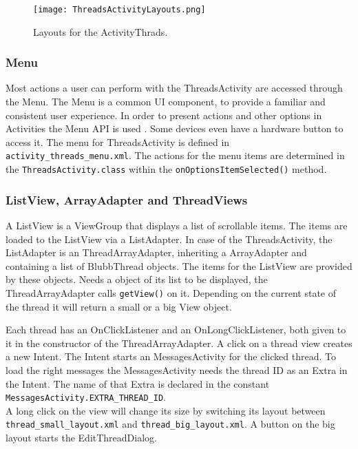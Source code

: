 \documentclass[12pt,a4paper,oneside]{report}
\newcommand{\code}[1]{\lstinline{#1}}
\begin{document}
\begin{figure}[!ht]
	\centering
    \texttt{[image: ThreadsActivityLayouts.png]}
	\caption{Layouts for the ActivityThrads.}
	\label{fig:ThreadsActivityLayouts}
\end{figure}


\subsubsection{Menu}
Most actions a user can perform with the ThreadsActivity are accessed through the Menu. The Menu is a common UI component, to provide a familiar and consistent user experience. In order to present actions and other options in Activities the Menu API is used \citep{aDefMenu}. Some devices even have a hardware button to access it. The menu for ThreadsActivity is defined in \code{activity_threads_menu.xml}.
 The actions for the menu items are determined in the \code{ThreadsActivity.class} within the \code{onOptionsItemSelected()} method.

\subsubsection{ListView, ArrayAdapter and ThreadViews}
A ListView is a ViewGroup that displays a list of scrollable items\citep{aDefListView}. The items are loaded to the ListView via a ListAdapter. In case of the ThreadsActivity, the ListAdapter is an ThreadArrayAdapter, inheriting a ArrayAdapter and containing a list of BlubbThread objects. The items for the ListView are provided by these objects. Needs a object of its list to be displayed, the ThreadArrayAdapter calls \code{getView()} on it. Depending on the current state of the thread it will return a small or a big View object. 

Each thread has an OnClickListener and an OnLongClickListener, both given to it in the constructor of the ThreadArrayAdapter. A click on a thread view creates a new Intent.  The Intent starts an MessagesActivity for the clicked thread. To load the right messages the MessagesActivity needs the thread ID as an Extra in the Intent. The name of that Extra is declared in the constant \code{MessagesActivity.EXTRA_THREAD_ID}.\\


A long click on the view will change its size by switching its layout between \code{thread_small_layout.xml} and \code{thread_big_layout.xml}. A button on the big layout starts the EditThreadDialog.\\
\end{document}
